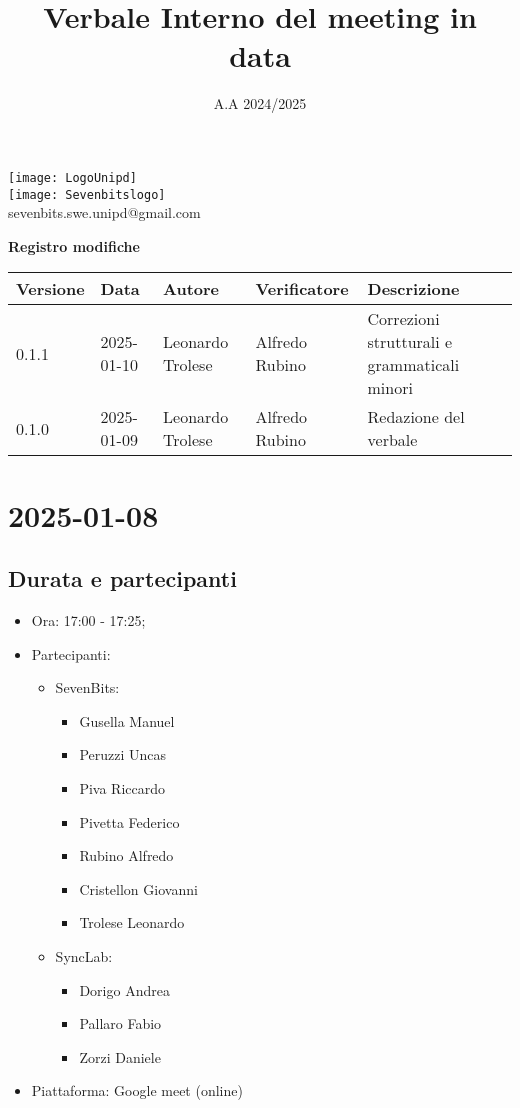 \documentclass[10pt]{article}
\title{Verbale Interno del meeting in data}
\date{A.A 2024/2025}
\begin{document}
\maketitle
\begin{center}
\texttt{[image: LogoUnipd]}\\
\texttt{[image: Sevenbitslogo]}\\
sevenbits.swe.unipd@gmail.com\\
\vspace{2mm}

\textbf{Registro modifiche}\\
\vspace{2mm}
\begin{tabularx}{\textwidth}{|l|l|l|l|X|}
\hline
\textbf{Versione} & \textbf{Data} & \textbf{Autore} & \textbf{Verificatore} & \textbf{Descrizione} \\
\hline
0.1.1 & 2025-01-10 & Leonardo Trolese & Alfredo Rubino & Correzioni strutturali e grammaticali minori \\
\hline
0.1.0 & 2025-01-09 & Leonardo Trolese & Alfredo Rubino & Redazione del verbale \\
\hline
\end{tabularx}
\end{center}

\newpage
\tableofcontents
\newpage
\section{2025-01-08}
\subsection{Durata e partecipanti}
\begin{itemize}
\item Ora: 17:00 - 17:25;
\item Partecipanti: 	
	\begin{itemize}
	\item 	SevenBits:
			\begin{itemize}
				\item Gusella Manuel
				\item Peruzzi Uncas
				\item Piva Riccardo
				\item Pivetta Federico
				\item Rubino Alfredo
				\item Cristellon Giovanni
				\item Trolese Leonardo
			\end{itemize}
	\item 	SyncLab:
			\begin{itemize}
				\item Dorigo Andrea
				\item Pallaro Fabio
				\item Zorzi Daniele
			\end{itemize}
	\end{itemize}
\item Piattaforma: Google meet (online)
\end{itemize}
\end{document}
